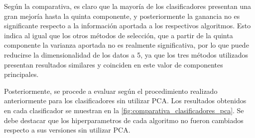 Según la comparativa, es claro que la mayoría de los clasificadores presentan una gran mejoría hasta la quinta componente, y posteriormente la ganancia no es significante respecto a la información aportada a los respectivos algoritmos. Esto indica al igual que los otros métodos de selección, que a partir de la quinta componente la varianza aportada no es realmente significativa, por lo que puede reducirse la dimensionalidad de los datos a 5, ya que los tres métodos utilizados presentan resultados similares y coinciden en este valor de componentes principales.

Posteriormente, se procede a evaluar según el procedimiento realizado anteriormente para los clasificadores sin utilizar PCA. Los resultados obtenidos en cada clasificador se muestran en la \autoref{fig:comparativa_clasificadores_pca}. Se debe destacar que los hiperparametros de cada algoritmo no fueron cambiados respecto a sus versiones sin utilizar PCA.


